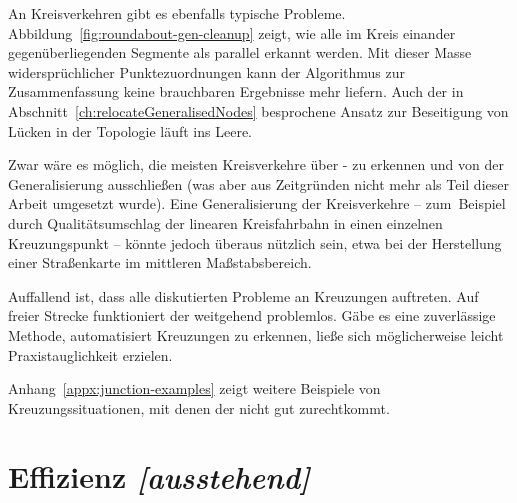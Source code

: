 \documentclass[../main/thesis.tex]{subfiles}
\begin{document}
An Kreisverkehren gibt es ebenfalls typische Probleme.
Abbildung~\ref{fig:roundabout-gen-cleanup} zeigt, wie alle im Kreis einander gegenüberliegenden Segmente als parallel erkannt werden.
Mit dieser Masse widersprüchlicher Punktezuordnungen kann der Algorithmus zur Zusammenfassung keine brauchbaren Ergebnisse mehr liefern.
Auch der in Abschnitt~\ref{ch:relocateGeneralisedNodes} besprochene Ansatz zur Beseitigung von Lücken in der Topologie läuft ins Leere.


Zwar wäre es möglich, die meisten Kreisverkehre über \osm- zu erkennen und von der Generalisierung ausschließen (was aber aus Zeitgründen nicht mehr als Teil dieser Arbeit umgesetzt wurde).
Eine Generalisierung der Kreisverkehre -- zum~Beispiel durch Qualitätsumschlag der linearen Kreisfahrbahn in einen einzelnen Kreuzungspunkt -- könnte jedoch überaus nützlich sein, etwa bei der Herstellung einer Straßenkarte im mittleren Maßstabsbereich.

\newpage
Auffallend ist, dass alle diskutierten Probleme an Kreuzungen auftreten.
Auf freier Strecke funktioniert der  weitgehend problemlos.
Gäbe es eine zuverlässige Methode, automatisiert Kreuzungen zu erkennen, ließe sich möglicherweise leicht Praxistauglichkeit erzielen.

Anhang~\ref{appx:junction-examples} zeigt weitere Beispiele von Kreuzungssituationen, mit denen der  nicht gut zurechtkommt.



\section{Effizienz \emph{[ausstehend]}}
\end{document}
